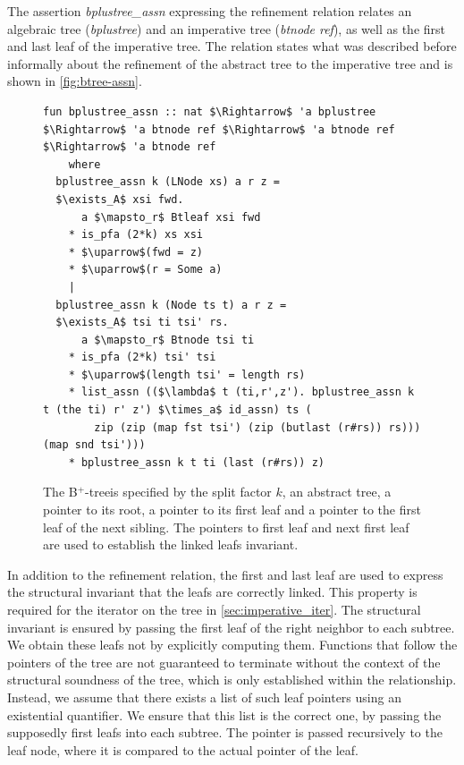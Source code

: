 \documentclass[a4paper,UKenglish,cleveref, autoref, thm-restate]{lipics-v2021}
\newcommand{\btree}{B$^+$-tree}
\begin{document}
The assertion \emph{bplustree\_assn} expressing the refinement relation
 relates an algebraic tree (\emph{bplustree})
and an imperative tree (\emph{btnode ref}), as well as the first and last leaf of the imperative tree.
The relation states what was described before informally
about the refinement of the abstract tree to the imperative tree
and is shown in \autoref{fig:btree-assn}.

\begin{figure}
   \centering 
\begin{lstlisting}[mathescape=true, language=Isabelle,label=lst:btree-relation]
fun bplustree_assn :: nat $\Rightarrow$ 'a bplustree $\Rightarrow$ 'a btnode ref $\Rightarrow$ 'a btnode ref $\Rightarrow$ 'a btnode ref
    where
  bplustree_assn k (LNode xs) a r z =
  $\exists_A$ xsi fwd.
      a $\mapsto_r$ Btleaf xsi fwd
    * is_pfa (2*k) xs xsi
    * $\uparrow$(fwd = z)
    * $\uparrow$(r = Some a)
    |
  bplustree_assn k (Node ts t) a r z =
  $\exists_A$ tsi ti tsi' rs.
      a $\mapsto_r$ Btnode tsi ti
    * is_pfa (2*k) tsi' tsi
    * $\uparrow$(length tsi' = length rs)
    * list_assn (($\lambda$ t (ti,r',z'). bplustree_assn k t (the ti) r' z') $\times_a$ id_assn) ts (
        zip (zip (map fst tsi') (zip (butlast (r#rs)) rs))) (map snd tsi')))
    * bplustree_assn k t ti (last (r#rs)) z)
\end{lstlisting}
    \caption[Assertion describing the imperative \btree]{
        The \btree is specified by the split factor $k$, an abstract tree,
        a pointer to its root, a pointer to its first leaf and a pointer
        to the first leaf of the next sibling.
        The pointers to first leaf and next first leaf are used
        to establish the linked leafs invariant.
    }
    \label{fig:btree-assn}
\end{figure}

In addition to the refinement relation,
the first and last leaf are used to express the structural invariant
that the leafs are correctly linked.
This property is required for the iterator on the tree in \autoref{sec:imperative_iter}.
The structural invariant is ensured
by passing the first leaf of the right neighbor to each subtree.
We obtain these leafs not by explicitly computing them.
Functions that follow the pointers of the tree are not guaranteed
to terminate without the context of the structural soundness of the tree,
which is only established within the relationship.
Instead, we assume that there exists a list of such leaf pointers using an existential quantifier.
We ensure that this list is the correct one, by passing the supposedly
first leafs into each subtree.
The pointer is passed recursively to the leaf node,
where it is compared to the actual pointer of the leaf.
\end{document}
